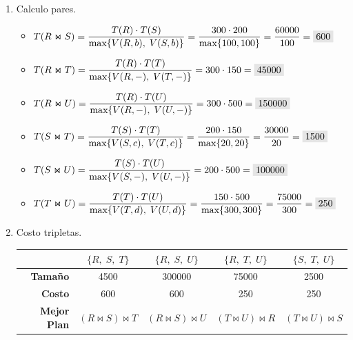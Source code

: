 \documentclass{templateNote}
\newcommand{\newparagraph}{\par\vspace{\baselineskip}\noindent}
\begin{document}
\begin{enumerate}
\begin{enumerate}[label=\arabic*)]
        \item Calculo pares.
        \begin{itemize}
            \item $T(R \Join S) =  \displaystyle\frac{T(R) \cdot T(S)}{\text{max}\{V(R,b), \; V(S,b)\}} = \frac{300 \cdot 200}{\text{max} \{100, 100\}} = \frac{60000}{100} = \colorbox{gray!20}{600}$ \newparagraph
            \item $T(R \Join T) =  \displaystyle\frac{T(R) \cdot T(T)}{\text{max}\{V(R,-), \; V(T,-)\}} = 300 \cdot 150 = \colorbox{gray!20}{45000}$ \newparagraph
            \item $T(R \Join U) =  \displaystyle\frac{T(R) \cdot T(U)}{\text{max}\{V(R,-), \; V(U,-)\}} = 300 \cdot 500 = \colorbox{gray!20}{150000}$ \newparagraph
            \item $T(S \Join T) =  \displaystyle\frac{T(S) \cdot T(T)}{\text{max}\{V(S,c), \; V(T,c)\}} = \frac{200 \cdot 150}{\text{max} \{20, 20\}} = \frac{30000}{20} = \colorbox{gray!20}{1500}$ \newparagraph
            \item $T(S \Join U) =  \displaystyle\frac{T(S) \cdot T(U)}{\text{max}\{V(S,-), \; V(U,-)\}} = 200 \cdot 500 = \colorbox{gray!20}{100000}$ \newparagraph
            \item $T(T \Join U) =  \displaystyle\frac{T(T) \cdot T(U)}{\text{max}\{V(T,d), \; V(U,d)\}} = \frac{150 \cdot 500}{\text{max} \{300, 300\}} = \frac{75000}{300} = \colorbox{gray!20}{250}$ \newparagraph
        \end{itemize}

        \item Costo tripletas.
        \begin{center}
            \begin{tabular}{|r|c|c|c|c|}
                \hline
                & $\{R, \; S, \; T\}$ & $\{R, \; S, \; U\}$ & $\{R, \; T, \; U\}$ & $\{S, \; T, \; U\}$ \\
                \hline
                \textbf{Tamaño} & 4500 & 300000 & 75000 & 2500 \\
                \hline
                \textbf{Costo}  & 600 & 600 & 250 & 250 \\
                \hline
                \textbf{Mejor Plan} & $(R \Join S) \Join T$ & $(R \Join S) \Join U$ & $(T \Join U) \Join R$ & $(T \Join U) \Join S$ \\
                \hline
            \end{tabular}
        \end{center}
        \newparagraph


\end{enumerate}
\end{enumerate}
\end{document}
